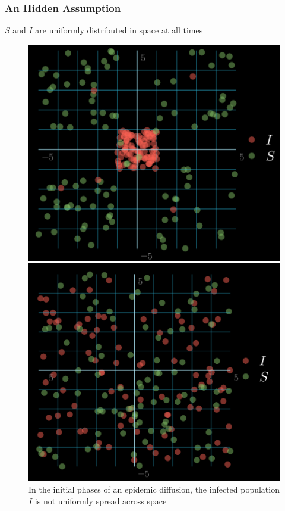 \documentclass[usenames,dvipsnames]{beamer}
\begin{document}
	
	\begin{frame}
		\frametitle{An Hidden Assumption}

	\begin{theorem}
		\centering
		$S$ and $I$ are uniformly distributed in space at all times
	\end{theorem}
\begin{figure}
	\centering
	\begin{minipage}{0.45\textwidth}
		\centering
		\includegraphics[width=4 cm]{dist1}
	\end{minipage}
	\begin{minipage}{0.45\textwidth}
		\centering
     	\includegraphics[width=4 cm]{dist2}
    \end{minipage}
	\caption{In the initial phases of an epidemic diffusion, the infected population $I$ is not uniformly spread across space}
\end{figure}
    	\end{frame}
\end{document}
